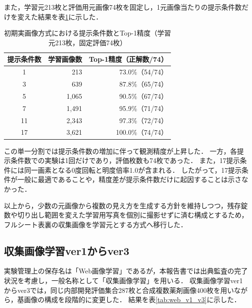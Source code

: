 \documentclass[uplatex,dvipdfmx]{jsarticle}
\begin{document}
また，学習元213枚と評価用元画像74枚を固定し，1元画像当たりの提示条件数だけを変えた結果を表\ref{tab:augmentation_history}に示した．

\begin{table}[H]
  \centering
  \caption{初期実画像方式における提示条件数とTop-1精度（学習元213枚，固定評価74枚）}
  \label{tab:augmentation_history}
  \small
  \begin{tabular}{|c|r|r|}
    \hline
    提示条件数 & 学習画像数 & Top-1精度（正解数/74） \\ \hline
    1 & 213 & 73.0\%（54/74） \\ \hline
    3 & 639 & 87.8\%（65/74） \\ \hline
    5 & 1,065 & 90.5\%（67/74） \\ \hline
    7 & 1,491 & 95.9\%（71/74） \\ \hline
    11 & 2,343 & 97.3\%（72/74） \\ \hline
    17 & 3,621 & 100.0\%（74/74） \\ \hline
  \end{tabular}
\end{table}

この単一分割では提示条件数の増加に伴って観測精度が上昇した．
一方，各提示条件数での実験は1回だけであり，評価枚数も74枚であった．
また，17提示条件には同一画素となる0度回転と明度倍率1.0が含まれる．
したがって，17提示条件が一般に最適であることや，精度差が提示条件数だけに起因することは示さなかった．

以上から，少数の元画像から複数の見え方を生成する方針を維持しつつ，残存錠数や切り出し範囲を変えた学習用写真を個別に撮影せずに済む構成とするため，フルシート表裏の収集画像を学習元とする方式へ移行した．

\subsection{収集画像学習ver1からver3}

実験管理上の保存名は「Web画像学習」であるが，本報告書では出典監査の完了状況を考慮し，一般名称として「収集画像学習」を用いる．
収集画像学習ver1からver3では，同じ内部開発評価集合287枚と合成複数薬剤画像400枚を用いながら，基画像の構成を段階的に変更した．
結果を表\ref{tab:web_v1_v3}に示した．
\end{document}
